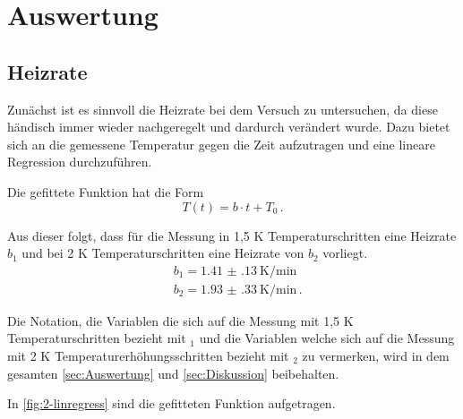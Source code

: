 \newpage
\section{Auswertung}
\label{sec:Auswertung}

\subsection{Heizrate}
\label{sec:heiss}
Zunächst ist es sinnvoll die Heizrate bei dem Versuch zu untersuchen, da diese händisch immer wieder nachgeregelt und dardurch verändert wurde. Dazu bietet sich an 
die gemessene Temperatur gegen die Zeit aufzutragen und eine lineare Regression durchzuführen.

\noindent
Die gefittete Funktion hat die Form
\begin{equation*}
  T(t) = b \cdot t + T_0 \, .
\end{equation*}

\noindent
Aus dieser folgt, dass für die Messung in 1,5 K Temperaturschritten eine Heizrate $b_1$ und bei 2 K Temperaturschritten eine Heizrate von $b_2$ vorliegt. 
\begin{align*}
  &b_1 = \SI{1.41(13)}{\kelvin\per\minute} \\
  &b_2 = \SI{1.93(33)}{\kelvin\per\minute} \, .
\end{align*}

\noindent
Die Notation, die Variablen die sich auf die Messung mit 1,5 K Temperaturschritten bezieht mit $_1$ und die Variablen welche sich auf die Messung mit 2 K Temperaturerhöhungsschritten 
bezieht mit $_2$ zu vermerken, wird in dem gesamten \autoref{sec:Auswertung} und \autoref{sec:Diskussion} beibehalten.

\noindent
In \autoref{fig:2-linregress} sind die gefitteten Funktion aufgetragen.

